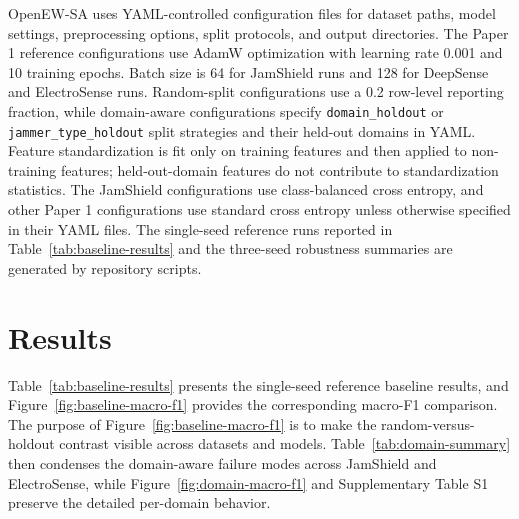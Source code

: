 \documentclass{ieeeaccess}
\newcommand{\artifact}[1]{\texttt{#1}}
\begin{document}
OpenEW-SA uses YAML-controlled configuration files for dataset paths, model settings, preprocessing options, split protocols, and output directories. The Paper 1 reference configurations use AdamW optimization with learning rate 0.001 and 10 training epochs. Batch size is 64 for JamShield runs and 128 for DeepSense and ElectroSense runs. Random-split configurations use a 0.2 row-level reporting fraction, while domain-aware configurations specify \artifact{domain\_holdout} or \artifact{jammer\_type\_holdout} split strategies and their held-out domains in YAML. Feature standardization is fit only on training features and then applied to non-training features; held-out-domain features do not contribute to standardization statistics. The JamShield configurations use class-balanced cross entropy, and other Paper 1 configurations use standard cross entropy unless otherwise specified in their YAML files. The single-seed reference runs reported in Table~\ref{tab:baseline-results} and the three-seed robustness summaries are generated by repository scripts.

\section{Results}

Table~\ref{tab:baseline-results} presents the single-seed reference baseline results, and Figure~\ref{fig:baseline-macro-f1} provides the corresponding macro-F1 comparison. The purpose of Figure~\ref{fig:baseline-macro-f1} is to make the random-versus-holdout contrast visible across datasets and models. Table~\ref{tab:domain-summary} then condenses the domain-aware failure modes across JamShield and ElectroSense, while Figure~\ref{fig:domain-macro-f1} and Supplementary Table S1 preserve the detailed per-domain behavior.
\end{document}
